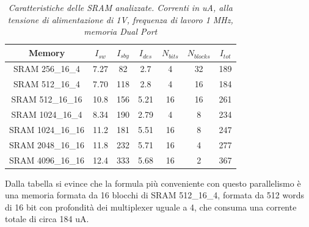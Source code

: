 \begin{table}[!h]\footnotesize
	\centering
	\begin{tabular}{|c|cccccc|}
		\hline
		\textbf{Memory} & \textbf{$I_{sw}$}& \textbf{$I_{sby}$} & \textbf{$I_{des}$} & \textbf{$N_{bits}$} & \textbf{$N_{blocks}$} &
		\textbf{$I_{tot}$}
		\\
		\hline
		SRAM 256_16_4 & 7.27 & 82 &2.7 & 4 & 32 & 189\\
		SRAM 512_16_4 & 7.70 & 118 & 2.8 &  4 & 16 & 184\\
		SRAM 512_16_16 & 10.8 & 156 & 5.21 & 16 & 16 & 261\\
		SRAM 1024_16_4 & 8.34 & 190 & 2.79 & 4 & 8 & 234\\
		SRAM 1024_16_16 & 11.2 & 181 & 5.51 & 16 & 8 & 247\\
		SRAM 2048_16_16 & 11.8 & 232 & 5.71 & 16 & 4 & 277\\
		SRAM 4096_16_16 & 12.4 & 333 & 5.68 & 16  & 2 & 367\\
		\hline
	\end{tabular}
	\caption{\textit{Caratteristiche delle SRAM analizzate. Correnti in uA, alla tensione di alimentazione di 1V, frequenza di lavoro 1 MHz, memoria Dual Port}}
	\label{Tab5_25}
\end{table}

Dalla tabella si evince che la formula più conveniente con questo parallelismo è una memoria formata da 16 blocchi di  SRAM 512\_16\_4, formata da 512  words  di 16 bit con profondità dei multiplexer uguale a 4, che consuma una corrente totale di circa 184 uA.
